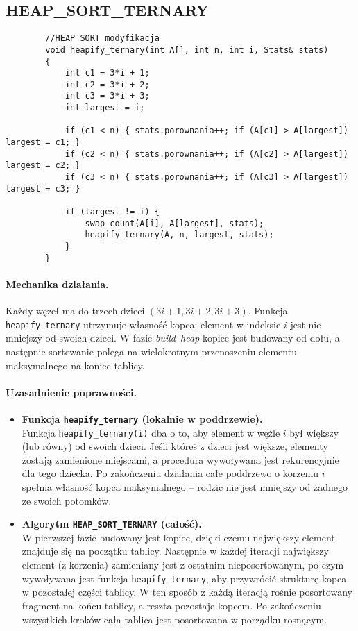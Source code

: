 \documentclass{article}
\begin{document}
	
	
	\subsection*{HEAP\_SORT\_TERNARY}
	
	\begin{lstlisting}
		//HEAP SORT modyfikacja
		void heapify_ternary(int A[], int n, int i, Stats& stats)
		{
			int c1 = 3*i + 1;
			int c2 = 3*i + 2;
			int c3 = 3*i + 3;
			int largest = i;
			
			if (c1 < n) { stats.porownania++; if (A[c1] > A[largest]) largest = c1; }
			if (c2 < n) { stats.porownania++; if (A[c2] > A[largest]) largest = c2; }
			if (c3 < n) { stats.porownania++; if (A[c3] > A[largest]) largest = c3; }
			
			if (largest != i) {
				swap_count(A[i], A[largest], stats);
				heapify_ternary(A, n, largest, stats);
			}
		}
	\end{lstlisting}
	
	\paragraph{Mechanika działania.}
	Każdy węzeł ma do trzech dzieci $(3i+1, 3i+2, 3i+3)$.  
	Funkcja \texttt{heapify\_ternary} utrzymuje własność kopca: element w indeksie $i$ jest nie mniejszy od swoich dzieci. W fazie \emph{build--heap} kopiec jest budowany od dołu, a następnie sortowanie polega na wielokrotnym przenoszeniu elementu maksymalnego na koniec tablicy.
	
	\paragraph{Uzasadnienie poprawności.}
	
	\begin{itemize}
		\item \textbf{Funkcja \texttt{heapify\_ternary} (lokalnie w poddrzewie).} \\
		Funkcja \texttt{heapify\_ternary(i)} dba o to, aby element w węźle $i$ był większy (lub równy) od swoich dzieci. 
		Jeśli któreś z dzieci jest większe, elementy zostają zamienione miejscami, a procedura wywoływana jest rekurencyjnie dla tego dziecka. 
		Po zakończeniu działania całe poddrzewo o korzeniu $i$ spełnia własność kopca maksymalnego – rodzic nie jest mniejszy od żadnego ze swoich potomków.
		
		\item \textbf{Algorytm \texttt{HEAP\_SORT\_TERNARY} (całość).} \\
		W pierwszej fazie budowany jest kopiec, dzięki czemu największy element znajduje się na początku tablicy. 
		Następnie w każdej iteracji największy element (z korzenia) zamieniany jest z ostatnim nieposortowanym, po czym wywoływana jest funkcja \texttt{heapify\_ternary}, 
		aby przywrócić strukturę kopca w pozostałej części tablicy. 
		W ten sposób z każdą iteracją rośnie posortowany fragment na końcu tablicy, a reszta pozostaje kopcem. 
		Po zakończeniu wszystkich kroków cała tablica jest posortowana w porządku rosnącym.
	\end{itemize}
	
\end{document}
